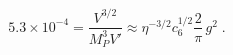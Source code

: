 \begin{equation}
5.3\times 10^{-4} = \frac{V^{3/2}}{M_P^3 V'} \approx \eta^{-3/2}
c_6^{1/2} \frac{2}{\pi}\, g^2 \;.
\end{equation}

